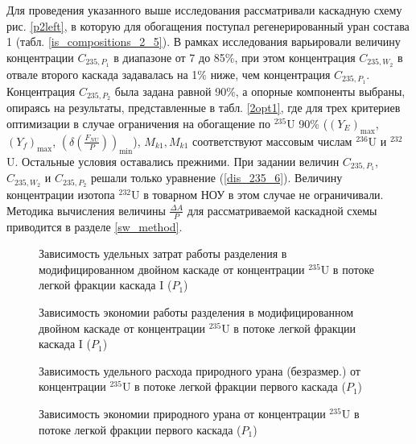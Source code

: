 Для проведения указанного выше исследования рассматривали каскадную схему рис. \ref{p2left}, в которую для обогащения поступал регенерированный уран состава 1 (табл. \ref{is_compositions_2_5}). В рамках исследования варьировали величину концентрации $C_{235,{P_1}}$ в диапазоне от 7 до 85\%, при этом концентрация $C_{235,{W_2}}$ в отвале второго каскада задавалась на 1\% ниже, чем концентрация $C_{235,{P_1}}$. Концентрация $C_{235,{P_2}}$ была задана равной 90\%, а опорные компоненты выбраны, опираясь на результаты, представленные в табл. \ref{2opt1}, где для трех критериев оптимизации в случае ограничения на обогащение по $^{235}$U 90\% ($(Y_{E})_\text{max}$, $(Y_f)_\text{max}$, $(\delta(\frac{F_{NU}}{P}))_\text{min}$), $M_{k1}, M_{k1}$ соответствуют массовым числам $^{236}$U и $^{232}$U. Остальные условия оставались прежними. При задании величин $C_{235,{P_1}}$, $C_{235,{W_2}}$ и $C_{235,{P_2}}$  решали только уравнение (\ref{dis_235_6}). Величину концентрации изотопа $^{232}$U в товарном НОУ в этом случае не ограничивали.
Методика вычисления величины $\frac{\Delta A}{P}$ для рассматриваемой каскадной схемы приводится в разделе \ref{sw_method}.
\begin{figure}[ht]
    \centering
    \begin{minipage}{.5\textwidth}
        \centering
        
  \caption{{Зависимость удельных затрат работы разделения в модифицированном двойном каскаде  от концентрации $^{235}$U в потоке легкой фракции каскада I ($P_1$){\label{SWP1}}}}
  \end{minipage}%
    \begin{minipage}{.5\textwidth}
      \centering
      
\caption{{Зависимость экономии работы разделения в модифицированном двойном каскаде от концентрации $^{235}$U в потоке легкой фракции каскада I ($P_1$){\label{SW_lP1}}}}
    \end{minipage}
\end{figure}

\begin{figure}[ht]
    \centering
    \begin{minipage}{.5\textwidth}
        \centering
        
  \caption{{Зависимость удельного расхода природного урана (безразмер.) от концентрации $^{235}$U в потоке легкой фракции первого каскада ($P_1$){\label{FnuP1}}}}
  \end{minipage}%
    \begin{minipage}{.5\textwidth}
      \centering
      
\caption{{Зависимость экономии природного урана от концентрации $^{235}$U в потоке легкой фракции первого каскада ($P_1$){\label{pFoP1}}}}
    \end{minipage}
\end{figure}



